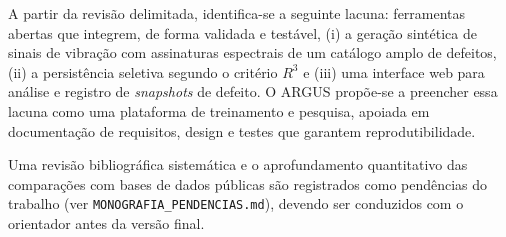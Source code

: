A partir da revisão delimitada, identifica-se a seguinte lacuna: ferramentas
abertas que integrem, de forma validada e testável, (i) a geração sintética de
sinais de vibração com assinaturas espectrais de um catálogo amplo de defeitos,
(ii) a persistência seletiva segundo o critério \(R^3\) e (iii) uma interface
web para análise e registro de \emph{snapshots} de defeito. O ARGUS propõe-se a
preencher essa lacuna como uma plataforma de treinamento e pesquisa, apoiada em
documentação de requisitos, design e testes que garantem reprodutibilidade.

Uma revisão bibliográfica sistemática e o aprofundamento quantitativo das
comparações com bases de dados públicas são registrados como pendências do
trabalho (ver \texttt{MONOGRAFIA\_PENDENCIAS.md}), devendo ser conduzidos com o
orientador antes da versão final.
